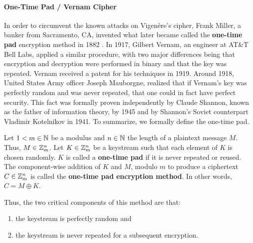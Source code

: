 

			\paragraph*{One-Time Pad / Vernam Cipher}

In order to circumvent the known attacks on Vigen\`{e}re's cipher, Frank Miller,  a banker from Sacramento, CA, invented what later became called the {\bf one-time pad}  encryption method in 1882 \cite{bellovin}. In 1917, Gilbert Vernam,  an engineer at AT\&T Bell Labs, applied a similar procedure, with two major differences being that encryption and decryption were performed in binary and that the key was repeated. Vernam received a patent for his techniques in 1919. Around 1918, United States Army officer Joseph Mauborgne,  realized that if Vernam's key was perfectly random and was never repeated, that one could in fact have perfect security. This fact was formally proven independently by Claude Shannon, known as the father of information theory, by 1945 and by Shannon's Soviet counterpart Vladimir Kotelnikov in 1941. To summarize, we formally define the one-time pad.

\begin{definition}
Let $1<m\in\mathbb{N}$ be a modulus and $n\in\mathbb{N}$ the length of a plaintext message $M$. Thus, $M \in \mathbb{Z}_m^n$. Let $K\in\mathbb{Z}_m^n$ be a keystream such that each element of $K$ is chosen randomly. $K$ is called a {\bf one-time pad} if it is never repeated or reused. The component-wise addition of $K$ and $M$, modulo $m$ to produce a ciphertext $C\in\mathbb{Z}_m^n$ is called the {\bf one-time pad encryption method}. In other words, $C = M\oplus K$.
\end{definition}

Thus, the two critical components of this method are that:
\begin{enumerate}
	\item the keystream is perfectly random and
	\item the keystream is never repeated for a subsequent encryption.
\end{enumerate}

